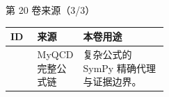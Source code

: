 \begin{frame}[t]{第 20 卷来源（3/3）}
\scriptsize\begin{tabularx}{\linewidth}{p{0.17\linewidth}p{0.28\linewidth}Y}
\toprule ID & 来源 & 本卷用途\\\midrule
{} & MyQCD 完整公式链 & 复杂公式的 SymPy 精确代理与证据边界。\\
\bottomrule\end{tabularx}\end{frame}

